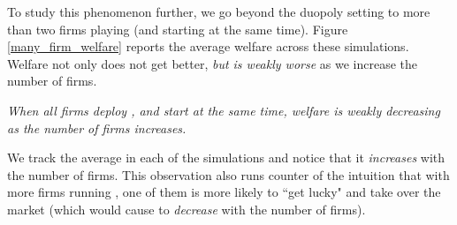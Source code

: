 \documentclass[../competing_bandits_with_appendix.tex]{subfiles}
\begin{document}
To study this phenomenon further, we go beyond the duopoly setting to more than two firms playing \DG (and starting at the same time). Figure \ref{many_firm_welfare} reports the average welfare
across these simulations. Welfare not only does not get better, \textit{but is weakly worse} as we increase the number of firms.

\begin{finding}
\textit{When all firms deploy \DG, and start at the same time, welfare is weakly decreasing as the number of firms increases.}
\end{finding}


We track the average \Eeog in each of the
simulations and notice that it \textit{increases} with the number of firms.
This observation also runs counter of the intuition that with more firms running \DG, one of them is more likely to ``get lucky" and take over the market (which would cause \Eeog to \emph{decrease} with the number of firms).

\end{document}
